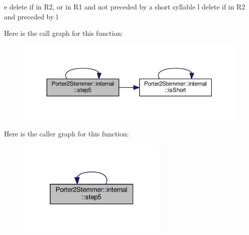 e delete if in R2, or in R1 and not preceded by a short syllable l delete if in R2 and preceded by l 

Here is the call graph for this function\+:\nopagebreak
\begin{figure}[H]
\begin{center}
\leavevmode
\includegraphics[width=350pt]{porter2__stemmer_8h_ad53abf614a24cba562dba83857f42091_cgraph}
\end{center}
\end{figure}




Here is the caller graph for this function\+:\nopagebreak
\begin{figure}[H]
\begin{center}
\leavevmode
\includegraphics[width=205pt]{porter2__stemmer_8h_ad53abf614a24cba562dba83857f42091_icgraph}
\end{center}
\end{figure}


